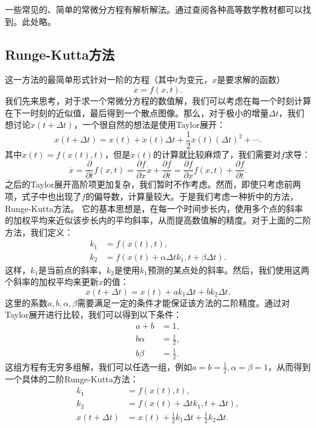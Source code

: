 \documentclass[a4paper, 12pt]{article}
\begin{document}
    一些常见的、简单的常微分方程有解析解法。通过查阅各种高等数学教材都可以找到。此处略。

    \subsection{Runge-Kutta方法}

    这一方法的最简单形式针对一阶的方程（其中$t$为变元，$x$是要求解的函数）
    \[
    \dot{x}=f(x,t).
    \]
    我们先来思考，对于求一个常微分方程的数值解，我们可以考虑在每一个时刻计算在下一时刻的近似值，最后得到一个散点图像。那么，对于极小的增量$\Delta t$，我们想讨论$x(t+\Delta t)$，一个很自然的想法是使用Taylor展开：
    \[
    x(t+\Delta t)=x(t)+\dot{x}(t)\Delta t+\frac{1}{2}\ddot{x}(t){(\Delta t)}^2+\cdots.
    \]
    其中$\dot{x}(t)=f(x(t),t)$，但是$\ddot{x}(t)$的计算就比较麻烦了，我们需要对$f$求导：
    \[
    \ddot{x}=\frac{\partial}{\partial t}f(x,t)=\frac{\partial f}{\partial x}\dot{x}+\frac{\partial f}{\partial t}=\frac{\partial f}{\partial x}f(x,t)+\frac{\partial f}{\partial t}.
    \]
    之后的Taylor展开高阶项更加复杂，我们暂时不作考虑。然而，即使只考虑前两项，式子中也出现了$f$的偏导数，计算量较大。于是我们考虑一种折中的方法，Runge-Kutta方法。 它的基本思想是，在每一个时间步长内，使用多个点的斜率的加权平均来近似该步长内的平均斜率，从而提高数值解的精度。对于上面的二阶方法，我们定义：
    \begin{align*}
        k_1&=f(x(t),t),\\
        k_2&=f\left(x(t)+\alpha\Delta tk_1,t+\beta\Delta t\right).
    \end{align*}
    这样，$k_1$是当前点的斜率，$k_2$是使用$k_1$预测的某点处的斜率。然后，我们使用这两个斜率的加权平均来更新$x$的值：
    \[
    x(t+\Delta t)=x(t)+ak_1\Delta t+bk_2\Delta t.
    \]
    这里的系数$a,b,\alpha,\beta$需要满足一定的条件才能保证该方法的二阶精度。通过对Taylor展开进行比较，我们可以得到以下条件：
    \begin{align*}
        a+b&=1,\\
        b\alpha&=\frac{1}{2},\\
        b\beta&=\frac{1}{2}.
    \end{align*}
    这组方程有无穷多组解，我们可以任选一组，例如$a=b=\frac{1}{2},\alpha=\beta=1$，从而得到一个具体的二阶Runge-Kutta方法：
    \begin{align*}
        k_1&=f(x(t),t),\\
        k_2&=f\left(x(t)+\Delta tk_1,t+\Delta t\right),\\
        x(t+\Delta t)&=x(t)+\frac{1}{2}k_1\Delta t+\frac{1}{2}k_2\Delta t.
    \end{align*}
\end{document}

